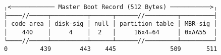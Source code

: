 \documentclass[varwidth=40em,crop]{standalone}
\begin{document}
\begin{verbatim}
╷<──────────── Master Boot Record (512 Bytes) ───────────>╷
├────//─────┬──────────┬──────┬──────//─────────┬─────────┤
│ code area │ disk-sig │ null │ partition table │ MBR-sig │  
│    440    │     4    │  2   │     16x4=64     │ 0xAA55  │
└────//─────┴──────────┴──────┴──────//─────────┴─────────┘
0         439        443    445               509       511
\end{verbatim}
\end{document}
